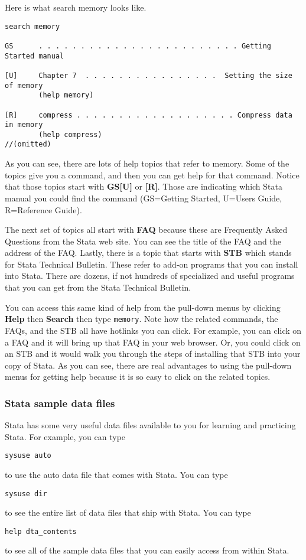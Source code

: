 Here is what search memory looks like.
\begin{lstlisting}
search memory

GS      . . . . . . . . . . . . . . . . . . . . . . . . Getting Started manual

[U]     Chapter 7  . . . . . . . . . . . . . . . .  Setting the size of memory
        (help memory)

[R]     compress . . . . . . . . . . . . . . . . . . . Compress data in memory
        (help compress)
//(omitted)
\end{lstlisting}

As you can see, there are lots of help topics that refer to memory. Some of the topics give you a command, and then you can get help for that command. Notice that those topics start with \textbf{GS[U]} or \textbf{[R]}. Those are indicating which Stata manual you could find the command (GS=Getting Started, U=Users Guide, R=Reference Guide).

The next set of topics all start with \textbf{FAQ} because these are Frequently Asked Questions from the Stata web site. You can see the title of the FAQ and the address of the FAQ. Lastly, there is a topic that starts with \textbf{STB} which stands for Stata Technical Bulletin. These refer to add-on programs that you can install into Stata. There are dozens, if not hundreds of specialized and useful programs that you can get from the Stata Technical Bulletin.

You can access this same kind of help from the pull-down menus by clicking \textbf{Help} then \textbf{Search} then type \lstinline{memory}. Note how the related commands, the FAQs, and the STB all have hotlinks you can click. For example, you can click on a FAQ and it will bring up that FAQ in your web browser. Or, you could click on an STB and it would walk you through the steps of installing that STB into your copy of Stata. As you can see, there are real advantages to using the pull-down menus for getting help because it is so easy to click on the related topics.

\subsubsection{Stata sample data files}

Stata has some very useful data files available to you for learning and practicing Stata. For example, you can type
\begin{lstlisting}
sysuse auto
\end{lstlisting}
to use the auto data file that comes with Stata. You can type
\begin{lstlisting}
sysuse dir
\end{lstlisting}
to see the entire list of data files that ship with Stata. You can type
\begin{lstlisting}
help dta_contents
\end{lstlisting}
to see all of the sample data files that you can easily access from within Stata.

